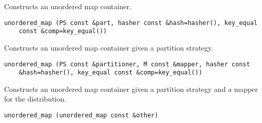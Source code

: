 Constructs an unordered map container. 
 
\begin{verbatim}
unordered_map (PS const &part, hasher const &hash=hasher(), key_equal 
    const &comp=key_equal())
\end{verbatim}

Constructs an unordered map container given a partition strategy. 
 
\begin{verbatim}
unordered_map (PS const &partitioner, M const &mapper, hasher const 
    &hash=hasher(), key_equal const &comp=key_equal())
\end{verbatim}

Constructs an unordered map container given a partition strategy and a mapper for the distribution. 
 
\begin{verbatim}
unordered_map (unordered_map const &other)
\end{verbatim}

